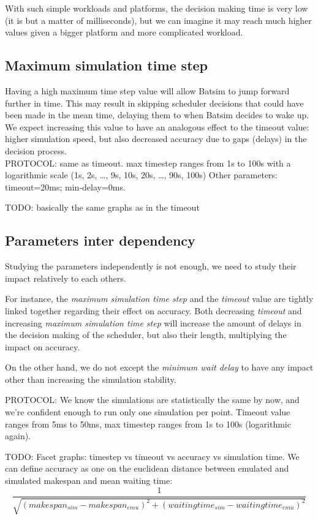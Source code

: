 With such simple workloads and platforms, the decision making time is very low
(it is but a matter of milliseconds), but we can imagine it may reach much
higher values given a bigger platform and more complicated workload.

\subsection{Maximum simulation time step}

Having a high maximum time step value will allow Batsim to jump forward further
in time. This may result in skipping scheduler decisions that could have been
made in the mean time, delaying them to when Batsim decides to wake up. We
expect increasing this value to have an analogous effect to the timeout value:
higher simulation speed, but also decreased accuracy due to gaps (delays) in
the decision process.\\

PROTOCOL: same as timeout. max timestep ranges from 1s to 100s with a
logarithmic scale (1s, 2s, \ldots, 9s, 10s, 20s, \ldots, 90s, 100s) Other
parameters: timeout=20ms; min-delay=0ms.

TODO: basically the same graphs as in the timeout

\subsection{Parameters inter dependency}

Studying the parameters independently is not enough, we need to study their
impact relatively to each others.

For instance, the \textit{maximum simulation time step} and the
\textit{timeout} value are tightly linked together regarding their effect on
accuracy. Both decreasing \textit{timeout} and increasing \textit{maximum
simulation time step} will increase the amount of delays in the decision making
of the scheduler, but also their length, multiplying the impact on accuracy.

On the other hand, we do not except the \textit{minimum wait delay} to have any
impact other than increasing the simulation stability.

PROTOCOL: We know the simulations are statistically the same by now, and we're
confident enough to run only one simulation per point. Timeout value ranges
from 5ms to 50ms, max timestep ranges from 1s to 100s (logarithmic again).

TODO: Facet graphs: timestep vs timeout vs accuracy vs simulation time. We can
define accuracy as one on the euclidean distance between emulated and simulated
makespan and mean waiting time: \[\frac{1}{\sqrt{(makespan_{sim} -
	makespan_{emu})^2 + (waitingtime_{sim} - waitingtime_{emu})^2}}\]

